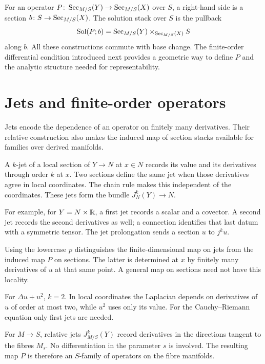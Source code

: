 For an operator $P\colon\operatorname{Sec}_{M/S}(Y)\to\operatorname{Sec}_{M/S}(X)$ over $S$, a
right-hand side is a section $b\colon S\to\operatorname{Sec}_{M/S}(X)$. The solution
stack over $S$ is the pullback
\[
 \operatorname{Sol}(P;b)=\operatorname{Sec}_{M/S}(Y)\times_{\operatorname{Sec}_{M/S}(X)}S
\]
along $b$.
All these constructions commute with base change.
The finite-order differential condition introduced next provides a
geometric way to define $P$ and the analytic structure needed for
representability.

\section{Jets and finite-order operators}

Jets encode the dependence of an operator on finitely many derivatives.
Their relative construction also makes the induced map of section
stacks available for families over derived manifolds.

A $k$-jet of a local section of $Y\to N$ at $x\in N$ records its value
and its derivatives through order $k$ at $x$.
Two sections define the same jet when those derivatives agree in local
coordinates. The chain rule makes this independent of the coordinates.
These jets form the bundle $J_N^k(Y)\to N$.

For example, for $Y=N\times\mathbb{R}$, a first jet records a scalar and a covector.
A second jet records the second derivatives as well; a connection
identifies that last datum with a symmetric tensor.
The jet prolongation sends a section $u$ to $j^ku$.


Using the lowercase $p$ distinguishes the finite-dimensional map on
jets from the induced map $P$ on sections.
The latter is determined at $x$ by finitely many derivatives of $u$ at
that same point. A general map on sections need not have this locality.

For $\Delta u+u^2$, $k=2$. In local coordinates the Laplacian depends
on derivatives of $u$ of order at most two, while $u^2$ uses only its value.
For the Cauchy--Riemann equation only first jets are needed.

For $M\to S$, relative jets $J^k_{M/S}(Y)$ record derivatives in the
directions tangent to the fibres $M_s$. No differentiation in the
parameter $s$ is involved. The resulting map $P$ is therefore an
$S$-family of operators on the fibre manifolds.

